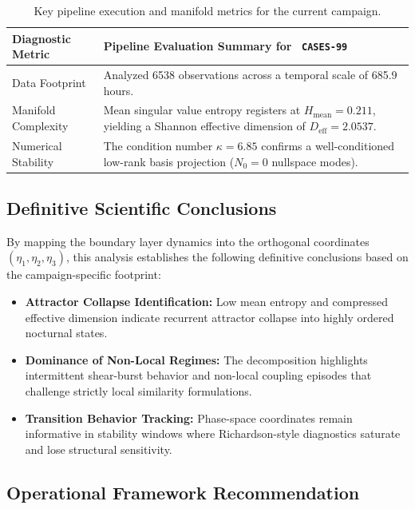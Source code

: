 \documentclass[11pt,a4paper]{article}
\begin{document}
\begin{table}[htbp]
    \centering
    \small
    \begin{tabular}{l p{9cm}}
        \hline
                \textbf{Diagnostic Metric} & \textbf{Pipeline Evaluation Summary for \texttt{ CASES-99 }} \\ \hline
        Data Footprint & Analyzed 6538 observations across a temporal scale of 685.9 hours. \\
        Manifold Complexity & Mean singular value entropy registers at $H_{\text{mean}} = 0.211$, yielding a Shannon effective dimension of $D_{\text{eff}} = 2.0537$. \\
        Numerical Stability & The condition number $\kappa = 6.85$ confirms a well-conditioned low-rank basis projection ($N_0 = 0$ nullspace modes). \\ \hline
    \end{tabular}
    \caption{Key pipeline execution and manifold metrics for the current campaign.}
    \label{tab:pipeline_summary_CASES-99}
\end{table}

\subsection{Definitive Scientific Conclusions}

By mapping the boundary layer dynamics into the orthogonal coordinates $(\eta_1, \eta_2, \eta_3)$, this analysis establishes the following definitive conclusions based on the campaign-specific footprint:

\begin{itemize}
    \item \textbf{ Attractor Collapse Identification: } Low mean entropy and compressed effective dimension indicate recurrent attractor collapse into highly ordered nocturnal states.
    \item \textbf{ Dominance of Non-Local Regimes: } The decomposition highlights intermittent shear-burst behavior and non-local coupling episodes that challenge strictly local similarity formulations.
    \item \textbf{ Transition Behavior Tracking: } Phase-space coordinates remain informative in stability windows where Richardson-style diagnostics saturate and lose structural sensitivity.
\end{itemize}

\subsection{Operational Framework Recommendation}
\end{document}

